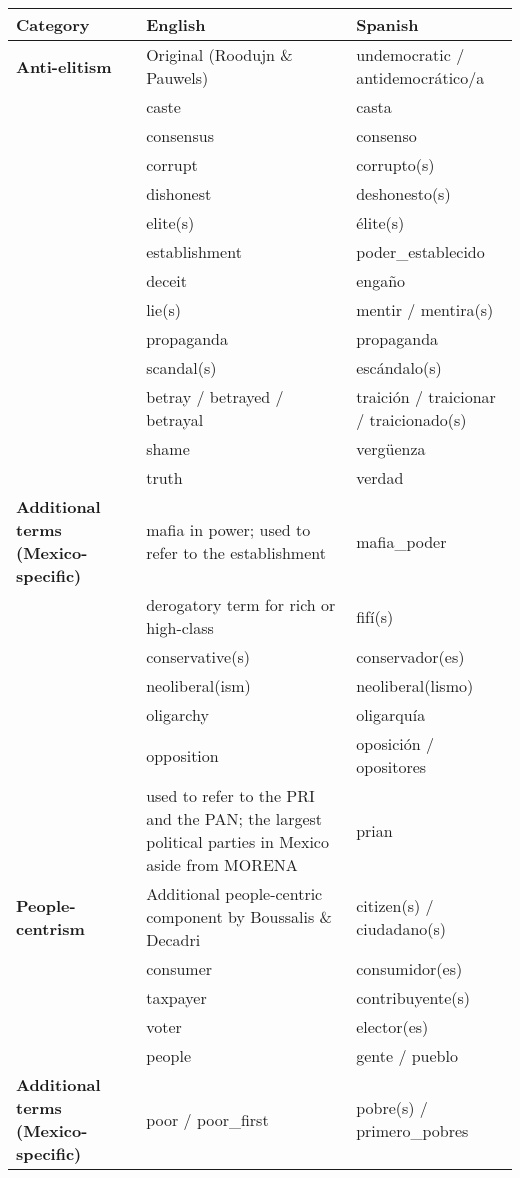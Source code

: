 \documentclass[]{article}
\begin{document}
\begin{longtable}{|p{3cm}|p{4cm}|p{4cm}|}
	\hline
	\textbf{\small Category} & \textbf{\small English} & \textbf{\small Spanish} \\
	\hline
	\textbf{\small Anti-elitism} & \small Original (Roodujn \& Pauwels) & \small undemocratic / antidemocrático/a \\
	& \small caste & \small casta \\
	& \small consensus & \small consenso \\
	& \small corrupt & \small corrupto(s) \\
	& \small dishonest & \small deshonesto(s) \\
	& \small elite(s) & \small élite(s) \\
	& \small establishment & \small poder\_establecido \\
	& \small deceit & \small engaño \\
	& \small lie(s) & \small mentir / mentira(s) \\
	& \small propaganda & \small propaganda \\
	& \small scandal(s) & \small escándalo(s) \\
	& \small betray / betrayed / betrayal & \small traición / traicionar / traicionado(s) \\
	& \small shame & \small vergüenza \\
	& \small truth & \small verdad \\
	\textbf{\small Additional terms (Mexico-specific)} & \small mafia in power; used to refer to the establishment & \small mafia\_poder \\
	& \small derogatory term for rich or high-class & \small fifí(s) \\
	& \small conservative(s) & \small conservador(es) \\
	& \small neoliberal(ism) & \small neoliberal(lismo) \\
	& \small oligarchy & \small oligarquía \\
	& \small opposition & \small oposición / opositores \\
	& \small used to refer to the PRI and the PAN; the largest political parties in Mexico aside from MORENA & \small prian \\
	\textbf{\small People-centrism} & \small Additional people-centric component by Boussalis \& Decadri & \small citizen(s) / ciudadano(s) \\
	& \small consumer & \small consumidor(es) \\
	& \small taxpayer & \small contribuyente(s) \\
	& \small voter & \small elector(es) \\
	& \small people & \small gente / pueblo \\
	\textbf{\small Additional terms (Mexico-specific)} & \small poor / poor\_first & \small pobre(s) / primero\_pobres \\
	\hline
\end{longtable}
\end{document}
